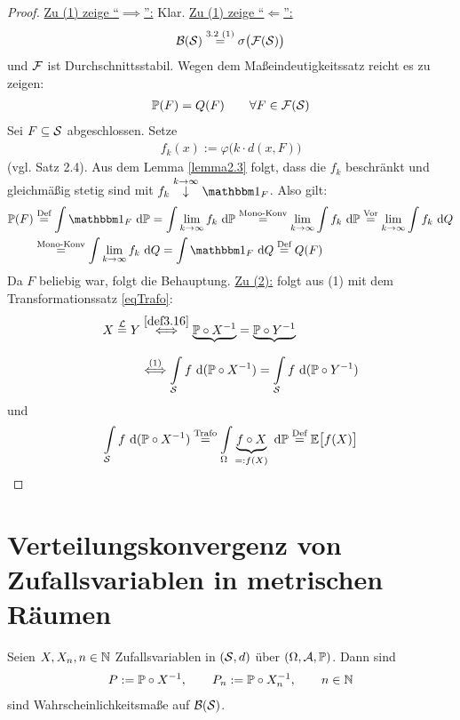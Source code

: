 \begin{proof}
	\underline{Zu (1) zeige ``$\implies$'':} Klar.\nl
	\underline{Zu (1) zeige ``$\Longleftarrow$'':}
	\begin{align*}
		\B(\S)\stackeq{\text{3.2 (1)}}\sigma\big(\mathcal{F}(\S)\big)
	\end{align*}
	und $\F$ ist Durchschnittsstabil. Wegen dem Maßeindeutigkeitssatz reicht es zu zeigen:
	\begin{align*}
		\P(F)=Q(F)\qquad\forall F\in\mathcal{F}(\S)
	\end{align*}
	Sei $F\subseteq\S$ abgeschlossen. Setze
	\begin{align*}
		f_k(x):=\varphi\Big(k\cdot d(x,F)\Big)
	\end{align*}
	(vgl. Satz 2.4).
	Aus dem Lemma \ref{lemma2.3} folgt, dass die $f_k$ beschränkt und gleichmäßig stetig sind mit $f_k\stackrel{k\to\infty}{\downarrow}\indi_F$. 
	Also gilt:
	\begin{align*}
		\P(F)
		&\stackeq{\text{Def}}
		\int\limits\indi_F\d\P
		=\int\limits\lim\limits_{k\to\infty} f_k\d\P
		\stackeq{\text{Mono-Konv}}
		\lim\limits_{k\to\infty}\int\limits f_k\d\P
		\stackeq{\text{Vor}}
		\lim\limits_{k\to\infty}\int\limits f_k\d Q\\
		&\stackeq{\text{Mono-Konv}}
		\int\limits\lim\limits_{k\to\infty} f_k\d Q
		=\int\limits\indi_F\d Q
		\stackeq{\text{Def}} Q(F)
	\end{align*}
	Da $F$ beliebig war, folgt die Behauptung.\nl
	\underline{Zu (2):} folgt aus (1) mit dem Transformationssatz \eqref{eqTrafo}:
	\begin{align*}
		X\stackeq{\mathcal{L}} Y
		&\stackrel{\ref{def3.16}}{\Longleftrightarrow}
		\underbrace{\P\circ X^{-1}}_{}=\underbrace{\P\circ Y^{-1}}_{}\\
		&\stackrel{(1)}{\Longleftrightarrow}
		\int\limits_{\S} f\d(\P\circ X^{-1})=\int\limits_{\S} f\d(\P\circ Y^{-1})
	\end{align*}
	und
	\begin{align*}
		\int\limits_{\S} f\d(\P\circ X^{-1})
		\stackeq{\text{Trafo}}
		\int\limits_{\Omega}\underbrace{f\circ X}_{=:f(X)}\d\P
		\stackeq{\text{Def}}
		\E\big[f(X)\big]
	\end{align*}
\end{proof}

\section{Verteilungskonvergenz von Zufallsvariablen in metrischen Räumen}
Seien $X,X_n,n\in\N$ Zufallsvariablen in $(\S,d)$ über $(\Omega,\A,\P)$. 
Dann sind
\begin{align*}
	P:=\P\circ X^{-1},\qquad P_n:=\P\circ X_n^{-1},\qquad n\in\N
\end{align*}
sind Wahrscheinlichkeitsmaße auf $\B(\S)$.

